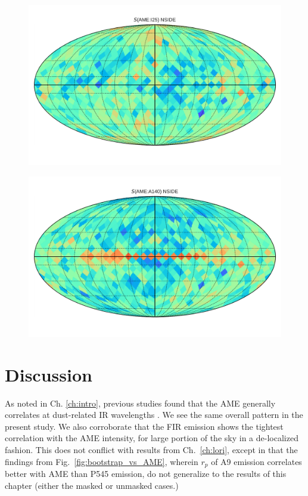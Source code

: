         \begin{figure}
         \includegraphics[width=\textwidth]{../Plots/Allsky_Corr/RadNorm/Spearman_Map_nside8_AMEtoI25.pdf}
         \centering
         \caption{}
         \label{fig:Spearman_Map_nside8_AMEtoIR_radnorm_I25}
      \end{figure}
        \begin{figure}
        \includegraphics[width=\textwidth]{../Plots/Allsky_Corr/RadNorm/Spearman_Map_nside8_AMEtoA140.pdf}
        \centering
        \caption{}
        \label{fig:Spearman_Map_nside8_AMEtoIR_radnorm_A140}
        \end{figure}


    \section{Discussion}
        As noted in Ch. \hyperref[ch:intro]{\ref{ch:intro}}, previous studies found that the AME generally correlates at dust-related IR wavelengths \citep{ysard10b,planckXV, hensley16}. We see the same overall pattern in the present study. We also corroborate that the FIR emission shows the tightest correlation with the AME intensity, for large portion of the sky in a de-localized fashion. This does not conflict with results from Ch.~\ref{ch:lori}, except in that the findings from Fig.~\ref{fig:bootstrap_vs_AME}, wherein $r_{p}$ of A9 emission correlates better with AME than P545 emission, do not generalize to the results of this chapter (either the masked or unmasked cases.)

